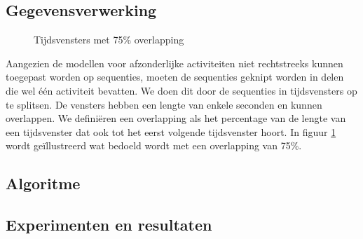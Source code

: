 \documentclass{article}
\begin{document}
\subsection{Gegevensverwerking}

\begin{figure}
\begin{center}
\end{center}
\caption{Tijdsvensters met 75\% overlapping}
\label{fig:overlap}
\end{figure}

Aangezien de modellen voor afzonderlijke activiteiten niet rechtstreeks kunnen toegepast worden op sequenties, moeten de sequenties geknipt worden in delen die wel \'e\'en activiteit bevatten. We doen dit door de sequenties in tijdsvensters op te splitsen. De vensters hebben een lengte van enkele seconden en kunnen overlappen. We defini\"eren een overlapping als het percentage van de lengte van een tijdsvenster dat ook tot het eerst volgende tijdsvenster hoort. In figuur \ref{fig:overlap} wordt ge\"illustreerd wat bedoeld wordt met een overlapping van 75\%.

\subsection{Algoritme}

\clearpage
\newpage

\subsection{Experimenten en resultaten}



\end{document}
